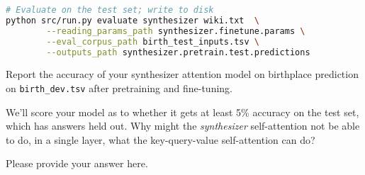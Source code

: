 \begin{parts}
\begin{lstlisting}[basicstyle=\ttfamily, language=bash]
# Evaluate on the test set; write to disk
python src/run.py evaluate synthesizer wiki.txt  \
        --reading_params_path synthesizer.finetune.params \
        --eval_corpus_path birth_test_inputs.tsv \
        --outputs_path synthesizer.pretrain.test.predictions
    \end{lstlisting}

    Report the accuracy of your synthesizer attention model on birthplace prediction on \texttt{birth\_dev.tsv} after pretraining and fine-tuning.

    \begin{subparts}
        \subpart[8]  We'll score your model as to whether it gets at least 5\% accuracy on the test set, which has answers held out.
        \subpart[2] Why might the \textit{synthesizer} self-attention not be able to do, in a single layer, what the key-query-value self-attention can do?

        \begin{answer}
            Please provide your answer here.
        \end{answer}

    \end{subparts}
\end{parts}

